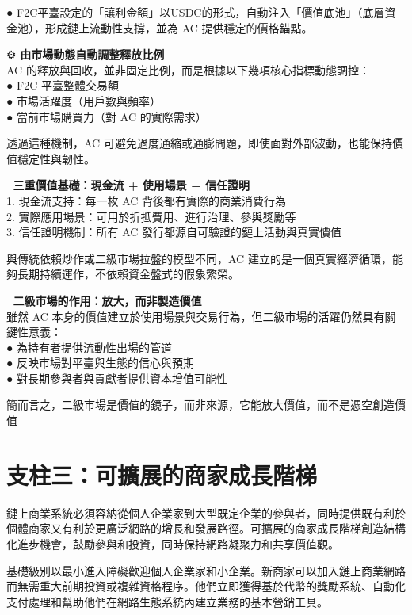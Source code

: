 \documentclass[
  Letterpaper,
]{scrbook}
\begin{document}
●
F2C平臺設定的「讓利金額」以USDC的形式，自動注入「價值底池」（底層資金池），形成鏈上流動性支撐，並為
AC 提供穩定的價格錨點。

⚙️ \textbf{由市場動態自動調整釋放比例}\\
AC 的釋放與回收，並非固定比例，而是根據以下幾項核心指標動態調控：\\
● F2C 平臺整體交易額\\
● 市場活躍度（用戶數與頻率）\\
● 當前市場購買力（對 AC 的實際需求）

透過這種機制，AC
可避免過度通縮或通膨問題，即使面對外部波動，也能保持價值穩定性與韌性。

🧱 \textbf{三重價值基礎：現金流 + 使用場景 + 信任證明}\\
1. 現金流支持：每一枚 AC 背後都有實際的商業消費行為\\
2. 實際應用場景：可用於折抵費用、進行治理、參與獎勵等\\
3. 信任證明機制：所有 AC 發行都源自可驗證的鏈上活動與真實價值

與傳統依賴炒作或二級市場拉盤的模型不同，AC
建立的是一個真實經濟循環，能夠長期持續運作，不依賴資金盤式的假象繁榮。

🔁 \textbf{二級市場的作用：放大，而非製造價值}\\
雖然 AC
本身的價值建立於使用場景與交易行為，但二級市場的活躍仍然具有關鍵性意義：\\
● 為持有者提供流動性出場的管道\\
● 反映市場對平臺與生態的信心與預期\\
● 對長期參與者與貢獻者提供資本增值可能性

簡而言之，二級市場是價值的鏡子，而非來源，它能放大價值，而不是憑空創造價值

\section{支柱三：可擴展的商家成長階梯}\label{ux652fux67f1ux4e09ux53efux64f4ux5c55ux7684ux5546ux5bb6ux6210ux9577ux968eux68af}

鏈上商業系統必須容納從個人企業家到大型既定企業的參與者，同時提供既有利於個體商家又有利於更廣泛網路的增長和發展路徑。可擴展的商家成長階梯創造結構化進步機會，鼓勵參與和投資，同時保持網路凝聚力和共享價值觀。

基礎級別以最小進入障礙歡迎個人企業家和小企業。新商家可以加入鏈上商業網路而無需重大前期投資或複雜資格程序。他們立即獲得基於代幣的獎勵系統、自動化支付處理和幫助他們在網路生態系統內建立業務的基本營銷工具。
\end{document}
